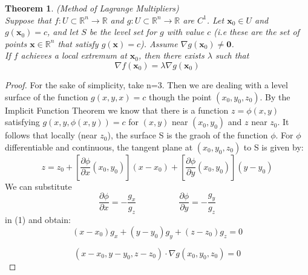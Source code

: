 \documentclass[]{article}
\newtheorem{theorem}{Theorem}
\begin{document}
\begin{theorem}(Method of Lagrange Multipliers) \\
    Suppose that $f:U\subset\mathbb{R}^{n}\to \mathbb{R}$ and $g:U\subset\mathbb{R}^{n}\to \mathbb{R}$ are $C^{1}$. Let $\pmb{x}_{0}\in U$ and $g(\pmb{x}_{0})=c$, and let $S$ be the level set for $g$ with value $c$ (i.e these are the set of points $\pmb{x}\in \mathbb{R}^{n}$ that satisfy $g(\pmb{x})=c$).
    Assume $\nabla g(\pmb{x}_{0})\neq \pmb{0}$. \\
    If $f$ achieves a local extremum at $\pmb{x}_{0}$, then there exists $\lambda$ such that
    $$
        \nabla f(\pmb{x}_{0}) = \lambda \nabla g(\pmb{x}_{0})
    $$
\end{theorem}

\begin{proof}
    For the sake of simplicity, take n=3. Then we are dealing with a level surface of the function $g(x,y,x)=c$ though the point $(x_0,y_0,z_0)$.
    By the Implicit Function Theorem we know that there is a function $z=\phi(x,y)$ satisfying $g(x,y,\phi(x,y)) = c$ for $(x,y)$ near $(x_0, y_0)$ and $z$ near $z_0$.
    It follows that locally (near $z_0$), the surface S is the graoh of the function $\phi$. For $\phi$ differentiable and continuous,
    the tangent plane at $(x_0,y_0,z_0)$ to S is given by:
    \begin{equation}
        z = z_0 + \left[\frac{\partial\phi}{\partial x}(x_0,y_0)\right](x-x_0) + \left[\frac{\partial\phi}{\partial y}(x_0,y_0)\right](y-y_0) \tag{1}
    \end{equation}
    We can substitute
    $$
        \frac{\partial\phi}{\partial x} = - \frac{g_x}{g_z} \hspace{30pt}  \hspace{30pt} \frac{\partial\phi}{\partial y} = - \frac{g_y}{g_z}
    $$
    in (1) and obtain:
    $$
        (x-x_0)g_x + (y-y_0)g_y + (z-z_0)g_z = 0
    $$
 
    \begin{equation}
        (x-x_0, y-y_0, z-z_0)\cdot\nabla g(x_0,y_0,z_0) = 0 \tag{2}
    \end{equation}


\end{proof}
\end{document}
